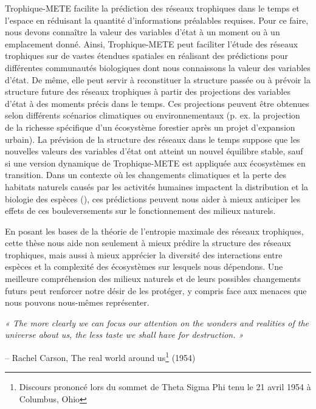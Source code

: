 Trophique-METE facilite la prédiction des réseaux trophiques dans le temps et
l'espace en réduisant la quantité d'informations préalables requises. Pour ce
faire, nous devons connaître la valeur des variables d'état à un moment ou à un
emplacement donné. Ainsi, Trophique-METE peut faciliter l'étude des réseaux
trophiques sur de vastes étendues spatiales en réalisant des prédictions pour
différentes communautés biologiques dont nous connaissons la valeur des
variables d'état. De même, elle peut servir à reconstituer la structure passée
ou à prévoir la structure future des réseaux trophiques à partir des projections
des variables d'état à des moments précis dans le temps. Ces projections peuvent
être obtenues selon différents scénarios climatiques ou environnementaux (p. ex.
la projection de la richesse spécifique d'un écosystème forestier après un
projet d'expansion urbain). La prévision de la structure des réseaux dans le
temps suppose que les nouvelles valeurs des variables d'état ont atteint un
nouvel équilibre stable, sauf si une version dynamique de Trophique-METE est
appliquée aux écosystèmes en transition. Dans un contexte où les changements
climatiques et la perte des habitats naturels causés par les activités humaines
impactent la distribution et la biologie des espèces
(\cite{Walther2002Ecological}), ces prédictions peuvent nous aider à mieux
anticiper les effets de ces bouleversements sur le fonctionnement des milieux
naturels. 

En posant les bases de la théorie de l'entropie maximale des réseaux trophiques,
cette thèse nous aide non seulement à mieux prédire la structure des réseaux
trophiques, mais aussi à mieux apprécier la diversité des interactions entre
espèces et la complexité des écosystèmes sur lesquels nous dépendons. Une
meilleure compréhension des milieux naturels et de leurs possibles changements
futurs peut renforcer notre désir de les protéger, y compris face aux menaces
que nous pouvons nous-mêmes représenter.


\bigskip
\bigskip
\bigskip

\begingroup

\raggedleft

\textit{« The more clearly we can focus our attention on the wonders and
realities of the universe about us, the less taste we shall have for
destruction. »} 
  

– Rachel Carson, The real world around us\footnote{Discours prononcé lors du sommet de Theta Sigma Phi tenu le 21 avril 1954 à Columbus, Ohio} (1954)

\endgroup

\endinput


